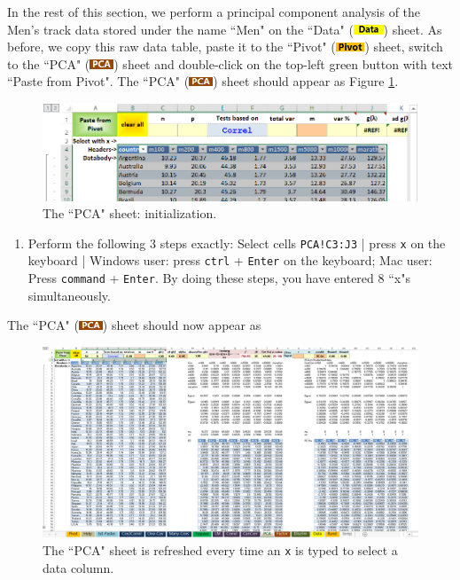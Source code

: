 \documentclass[article]{jss}
\newcommand{\shtData}{``Data" (\includegraphics[height=8pt, keepaspectratio=true]{DataSheetTab_png}) }
\newcommand{\shtPivot}{``Pivot" (\includegraphics[height=8pt, keepaspectratio=true]{PivotSheetTab_png}) }
\newcommand{\shtPCA}{``PCA" (\includegraphics[height=8pt, keepaspectratio=true]{PcaSheetTab_png}) }
\begin{document}
        In the rest of this section, we perform a principal component analysis of the Men's track data stored under the name ``Men" on the \shtData sheet. As before, we copy this raw data table, paste it to the \shtPivot sheet, switch to the \shtPCA sheet and double-click on the top-left green button with text ``Paste from Pivot". The \shtPCA sheet should appear as Figure \ref{fig:PCA sheet initialization}.
        \begin{figure}[!tbh]
        	\includegraphics[width=\linewidth, keepaspectratio=true]{PCASheetAfterPaste_png}
        	\vspace{-20pt}\centering{}\protect\caption{The ``PCA" sheet: initialization.}\label{fig:PCA sheet initialization}
        \end{figure}
        \begin{enumerate}
          \item Perform the following 3 steps exactly: Select cells \texttt{PCA!C3:J3} | press \texttt{x} on the keyboard | Windows user: press \texttt{ctrl} + \texttt{Enter} on the keyboard; Mac user: Press \texttt{command} + \texttt{Enter}. By doing these steps, you have entered 8 ``x"s simultaneously.
        \end{enumerate}
        The \shtPCA sheet should now appear as
        \begin{figure}[!tbh]
          \vspace{-10pt}\includegraphics[width=\linewidth,keepaspectratio=true]{PCASheetOutput_png}
          \vspace{-20pt}\centering{}\protect\caption{The ``PCA" sheet is refreshed every time an \texttt{x} is typed to select a data column.}
        \end{figure}
        
\end{document}
